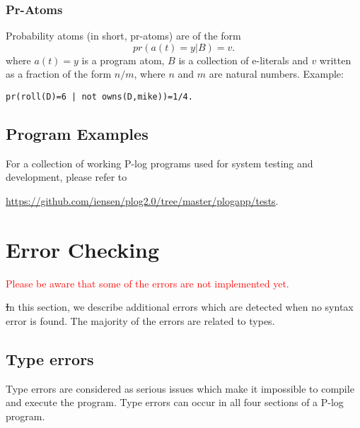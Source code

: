 \documentclass[12pt, letterpaper]{article}
\begin{document}
 \subsubsection{Pr-Atoms}

 Probability atoms (in short, pr-atoms) are of the form 
 $$pr(a(t) = y | B) = v.$$
 where $a(t) = y$ is a program atom, $B$ is a collection of e-literals and $v$  written as a fraction of the form $n/m$, where $n$ and $m$ are natural numbers.  Example:
\begin{center}
 \texttt{pr(roll(D)=6 | not owns(D,mike))=1/4.}
\end{center}
 \subsection{Program Examples}

 For a collection of working P-log programs used for system testing and development, please refer to
 \begin{center}
\url{https://github.com/iensen/plog2.0/tree/master/plogapp/tests}.
 \end{center}
 

 \section{Error Checking}

 \textcolor{red}{Please be aware that some of the errors are not implemented yet.}

\st
In this section, we describe  additional errors which are detected when no syntax error is found.
The majority of the errors are related to types.
\subsection{Type errors}
Type errors are considered as serious issues which make it  impossible to compile and execute the program.
Type errors can occur in all four sections of a P-log program.
\end{document}
